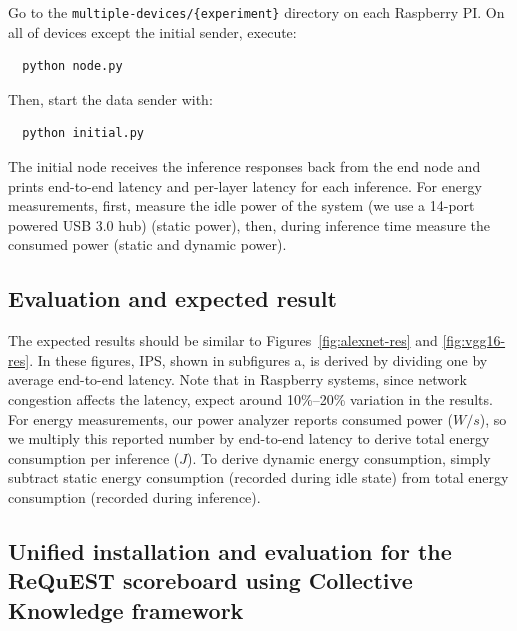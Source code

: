 \documentclass[sigplan]{acmart}
\begin{document}
  Go to the \texttt{multiple-devices/\{experiment\}} directory on each Raspberry PI. On all of devices except the initial sender, execute:
\begin{lstlisting}
  python node.py
\end{lstlisting}
Then, start the data sender with:
\begin{lstlisting}
  python initial.py
\end{lstlisting}
The initial node receives the inference responses back from the end node and prints end-to-end latency and per-layer latency for each inference. For energy measurements, first, measure the idle power of the system (we use a 14-port powered USB 3.0 hub) (static power), then, during inference time measure the consumed power (static and dynamic power).

\subsection{Evaluation and expected result}

The expected results should be similar to Figures~\ref{fig:alexnet-res} and \ref{fig:vgg16-res}. In these figures, IPS, shown in subfigures a, is derived by dividing one by average end-to-end latency. Note that in Raspberry systems, since network congestion affects the latency, expect around 10\%--20\% variation in the results. For energy measurements, our power analyzer reports consumed power ($W/s$), so we multiply this reported number by end-to-end latency to derive total energy consumption per inference ($J$). To derive dynamic energy consumption, simply subtract static energy consumption (recorded during idle state) from total energy consumption (recorded during inference).




\subsection{Unified installation and evaluation for the ReQuEST scoreboard using Collective Knowledge framework}
\end{document}
